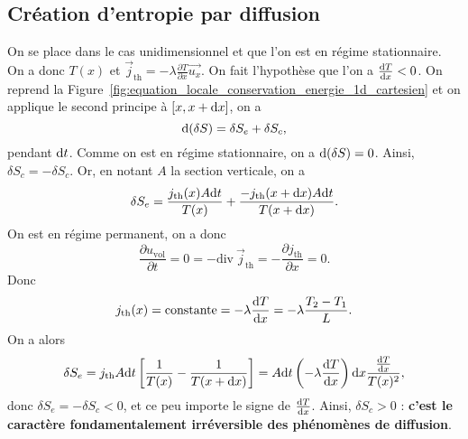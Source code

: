     \subsection{Création d'entropie par diffusion}
            
        On se place dans le cas unidimensionnel et que l'on est en régime stationnaire. On a donc $T(x)$ et $\vec{j}_{\text{th}}=-\lambda\frac{\partial T}{\partial x}\vec{u_x}$. On fait l'hypothèse que l'on a $\frac{\mathrm{d} T}{\mathrm{d} x}<0$. On reprend la Figure~\ref{fig:equation_locale_conservation_energie_1d_cartesien} et on applique le second principe à $[x,x+\mathrm{d} x]$, on a 
        \begin{equation*}
            \mathrm{d}(\delta S)=\delta S_e+\delta S_c,
        \end{equation*}
        pendant $\mathrm{d} t$. Comme on est en régime stationnaire, on a $\mathrm{d}(\delta S)=0$. Ainsi, $\delta S_c=-\delta S_c$. Or, en notant $A$ la section verticale, on a
        \begin{equation*}
            \delta S_e=\frac{j_{\text{th}}(x) A\mathrm{d} t}{T(x)}+\frac{-j_{\text{th}}(x+\mathrm{d} x)A\mathrm{d} t}{T(x+\mathrm{d} x)}.
        \end{equation*}
        On est en régime permanent, on a donc
        \begin{equation*}
            \frac{\partial u_{\text{vol}}}{\partial t}=0=-\mathrm{div}~\vec{j}_{\text{th}}=-\frac{\partial j_{\text{th}}}{\partial x}=0.
        \end{equation*}
        Donc 
        \begin{equation*}
            j_{\text{th}}(x)=\mathrm{constante}=-\lambda\frac{\mathrm{d} T}{\mathrm{d} x}=-\lambda\frac{T_2-T_1}{L}.
        \end{equation*}
        On a alors
        \begin{equation*}
            \delta S_e
            =j_{\text{th}}A\mathrm{d} t\left[
                \frac{1}{T(x)}-\frac{1}{T(x+\mathrm{d} x)}
            \right]=A\mathrm{d} t\left(-\lambda\frac{\mathrm{d} T}{\mathrm{d} x}\right)\mathrm{d} x\frac{\frac{\mathrm{d} T}{\mathrm{d} x}}{T(x)^{2}},
        \end{equation*}
        donc $\delta S_e=-\delta S_c<0$, et ce peu importe le signe de $\frac{\mathrm{d} T}{\mathrm{d} x}$. Ainsi, $\delta S_c>0$ : \textbf{c'est le caractère fondamentalement irréversible des phénomènes de diffusion}.